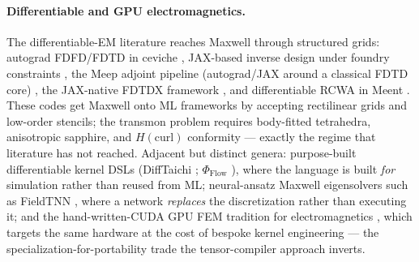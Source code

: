 \documentclass{anvil-paper}
\begin{document}
\paragraph{Differentiable and GPU electromagnetics.}
The differentiable-EM literature reaches Maxwell through structured grids:
autograd FDFD/FDTD in ceviche \citep{hughes2019forward}, JAX-based inverse
design under foundry constraints \citep{schubert2022inverse}, the Meep
adjoint pipeline (autograd/JAX around a classical FDTD core)
\citep{hammond2022high}, the JAX-native FDTDX framework
\citep{mahlau2026fdtdx}, and differentiable RCWA in Meent
\citep{kim2024meent}. These codes get Maxwell onto ML frameworks by
accepting rectilinear grids and low-order stencils; the transmon problem
requires body-fitted tetrahedra, anisotropic sapphire, and
$H(\mathrm{curl})$ conformity --- exactly the regime that literature has
not reached. Adjacent but distinct genera: purpose-built differentiable
kernel DSLs (DiffTaichi \citep{hu2019difftaichi}; $\Phi_{\mathrm{Flow}}$
\citep{holl2020learning}), where the language is built \emph{for}
simulation rather than reused from ML; neural-ansatz Maxwell eigensolvers
such as FieldTNN \citep{jiang2024fieldtnn}, where a network \emph{replaces}
the discretization rather than executing it; and the hand-written-CUDA GPU
FEM tradition for electromagnetics \citep{huantingmeng2014gpu}, which
targets the same hardware at the cost of bespoke kernel engineering ---
the specialization-for-portability trade the tensor-compiler approach
inverts.
\end{document}

